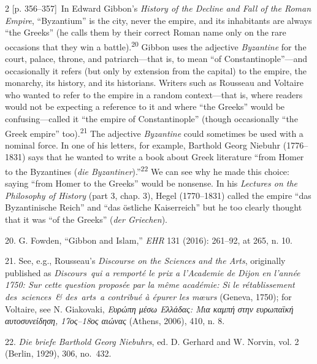 \documentclass[10pt,a4paper]{article}
\begin{document}
\begin{paracol}{2}
{\scriptsize\color{gray}[p. 356–357]}\ In Edward Gibbon’s \textit{History of the Decline and Fall of the Roman Empire}, “Byzantium” is the city, never the empire, and its inhabitants are always “the Greeks” (he calls them by their correct Roman name only on the rare occasions that they win a battle).\nobreak\textsuperscript{20} Gibbon uses the adjective \textit{Byzantine} for the court, palace, throne, and patriarch—that is, to mean “of Constantinople”—and occasionally it refers (but only by extension from the capital) to the empire, the monarchy, its history, and its historians. Writers such as Rousseau and Voltaire who wanted to refer to the empire in a random context—that is, where readers would not be expecting a reference to it and where “the Greeks” would be confusing—called it “the empire of Constantinople” (though occasionally “the Greek empire” too).\nobreak\textsuperscript{21} The adjective \textit{Byzantine} could sometimes be used with a nominal force. In one of his letters, for example, Barthold Georg Niebuhr (1776–1831) says that he wanted to write a book about Greek literature “from Homer to the Byzantines (\textit{die Byzantiner}).”\nobreak\textsuperscript{22} We can see why he made this choice: saying “from Homer to the Greeks” would be nonsense. In his\textit{ Lectures on the Philosophy of History }(part 3, chap. 3), Hegel (1770–1831) called the empire “das Byzantinische Reich” and “das östliche Kaiserreich” but he too clearly thought that it was “of the Greeks” (\textit{der Griechen}).\par{\small 20. G. Fowden, “Gibbon and Islam,” \textit{EHR} 131 (2016): 261–92, at 265, n. 10.\par}{\small 21.  See, e.g., Rousseau’s \textit{Discourse on the Sciences and the Arts}, originally published as \textit{Discours qui a remporté le prix a l’Academie de Dijon en l’année 1750: Sur cette question proposée par la même académie: Si le rétablissement des sciences \& des arts a contribué à épurer les mœurs} (Geneva, 1750); for Voltaire, see N. Giakovaki, \textit{Ευρώπη μέσω Ελλάδας: Μια καμπή στην ευρωπαϊκή αυτοσυνείδηση, 17ος–18ος αιώνας} (Athens, 2006), 410, n. 8.\par}{\small 22. \textit{Die briefe Barthold Georg Niebuhrs}, ed. D. Gerhard and W. Norvin, vol. 2 (Berlin, 1929), 306, no. 432.\par}
\switchcolumn*

\end{paracol}
\end{document}
